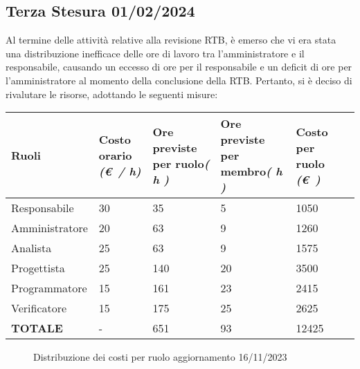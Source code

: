 \subsection{Terza Stesura 01/02/2024}\label{sec:TerzaStesura}
Al termine delle attività relative alla revisione RTB, è emerso che vi era stata una distribuzione inefficace delle ore di lavoro tra l'amministratore e il responsabile, causando un eccesso di ore per il responsabile e un deficit di ore per l'amministratore al momento della conclusione della RTB. Pertanto, si è deciso di rivalutare le risorse, adottando le seguenti misure:
\begin{center}
    \begin{tabular}{|C{3cm}|C{2cm}|C{2cm}|C{2cm}|C{2cm}|C{2cm}|}
        \hline

        \textbf{Ruoli}  & \textbf{Costo orario} \linebreak \textit{(\euro\ / h)} & \textbf{Ore previste per ruolo}\linebreak \textit{( h )} & \textbf{Ore previste per membro}\linebreak \textit{( h )} & \textbf{Costo per ruolo} \linebreak \textit{(\euro\ )} \\
        \hline\hline

        Responsabile & 30 & 35 & 5 & 1050 \\
        \hline
        Amministratore & 20 & 63 & 9 & 1260 \\
        \hline
        Analista & 25 & 63 & 9 & 1575 \\
        \hline
        Progettista & 25 & 140 & 20 & 3500 \\
        \hline
        Programmatore & 15 & 161 & 23 & 2415 \\
        \hline
        Verificatore & 15 & 175 & 25 & 2625 \\
        \hline\hline

        \textbf{TOTALE} & - & 651 & 93 & 12425 \\
        \hline
    \end{tabular}
\end{center}
\begin{figure}[H]
    \centering
    \caption{Distribuzione dei costi per ruolo aggiornamento 16/11/2023}
\end{figure}
